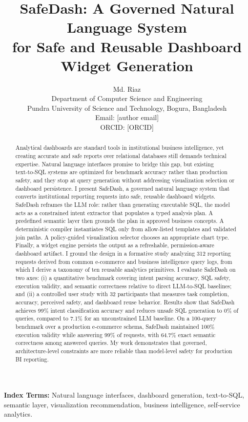 \documentclass[11pt]{article}
\title{SafeDash: A Governed Natural Language System\\
for Safe and Reusable Dashboard Widget Generation}
\author{Md. Riaz\\
Department of Computer Science and Engineering\\
Pundra University of Science and Technology, Bogura, Bangladesh\\
Email: [author email]\\
ORCID: [ORCID]}
\date{}
\begin{document}
\maketitle

\begin{abstract}
Analytical dashboards are standard tools in institutional business intelligence, yet creating accurate and safe reports over relational databases still demands technical expertise. Natural language interfaces promise to bridge this gap, but existing text‑to‑SQL systems are optimized for benchmark accuracy rather than production safety, and they stop at query generation without addressing visualization selection or dashboard persistence. I present SafeDash, a governed natural language system that converts institutional reporting requests into safe, reusable dashboard widgets. SafeDash reframes the LLM role: rather than generating executable SQL, the model acts as a constrained intent extractor that populates a typed analysis plan. A predefined semantic layer then grounds the plan in approved business concepts. A deterministic compiler instantiates SQL only from allow‑listed templates and validated join paths. A policy‑guided visualization selector chooses an appropriate chart type. Finally, a widget engine persists the output as a refreshable, permission‑aware dashboard artifact. I ground the design in a formative study analyzing 312 reporting requests derived from common e-commerce and business intelligence query logs, from which I derive a taxonomy of ten reusable analytics primitives. I evaluate SafeDash on two axes: (i) a quantitative benchmark covering intent parsing accuracy, SQL safety, execution validity, and semantic correctness relative to direct LLM‑to‑SQL baselines; and (ii) a controlled user study with 32 participants that measures task completion, accuracy, perceived safety, and dashboard reuse behavior. Results show that SafeDash achieves 99\% intent classification accuracy and reduces unsafe SQL generation to 0\% of queries, compared to 7.1\% for an unconstrained LLM baseline. On a 100-query benchmark over a production e‑commerce schema, SafeDash maintained 100\% execution validity while answering 99\% of requests, with 64.7\% exact semantic correctness among answered queries. My work demonstrates that governed, architecture‑level constraints are more reliable than model‑level safety for production BI reporting.
\end{abstract}

\noindent\textbf{Index Terms:} Natural language interfaces, dashboard generation, text‑to‑SQL, semantic layer, visualization recommendation, business intelligence, self‑service analytics.
\end{document}
